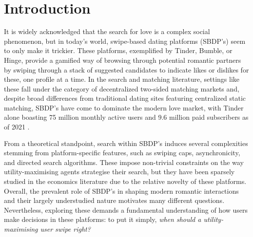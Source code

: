 \section{Introduction}
\label{sec:section1}
It is widely acknowledged that the search for love is a complex social phenomenon, but in today's world, swipe-based dating platforms (SBDP's) seem to only make it trickier.
These platforms, exemplified by Tinder, Bumble, or Hinge, provide a gamified way of browsing through potential romantic partners by swiping through a stack of suggested candidates to indicate likes or dislikes for these, one profile at a time.  
In the search and matching literature, settings like these fall under the category of decentralized two-sided matching markets \citep{kanoria2021facilitating} and, despite broad differences from traditional dating sites featuring centralized static matching, SBDP's have come to dominate the modern love market, with Tinder alone boasting 75 million monthly active users and 9.6 million paid subscribers as of 2021 \citep{web:tinder_stats}.

From a theoretical standpoint, search within SBDP's induces several complexities stemming from platform-specific features, such as swiping caps, asynchronicity, and directed search algorithms.
These impose non-trivial constraints on the way utility-maximising agents strategise their search, but they have been sparsely studied in the economics literature due to the relative novelty of these platforms.
Overall, the prevalent role of SBDP's in shaping modern romantic interactions and their largely understudied nature motivates many different questions.
Nevertheless, exploring these demands a fundamental understanding of how users make decisions in these platforms: to put it simply, \textit{when should a utility-maximising user swipe right?}

